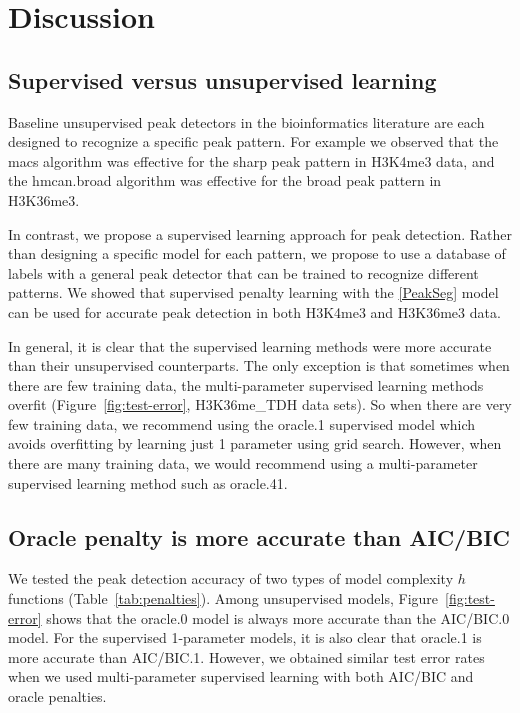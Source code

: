 \documentclass{article}
\begin{document}
\section{Discussion}
\label{sec:discussion}

\subsection{Supervised versus unsupervised learning}

Baseline unsupervised peak detectors in the bioinformatics literature
are each designed to recognize a specific peak pattern. For example we
observed that the macs algorithm was effective for the sharp peak
pattern in H3K4me3 data, and the hmcan.broad algorithm was effective
for the broad peak pattern in H3K36me3.

In contrast, we propose a supervised learning approach for peak
detection. Rather than designing a specific model for each pattern, we
propose to use a database of labels with a general peak detector that
can be trained to recognize different patterns. We showed that
supervised penalty learning with the \ref{PeakSeg} model can be used
for accurate peak detection in both H3K4me3 and H3K36me3 data.

In general, it is clear that the supervised learning methods were more
accurate than their unsupervised counterparts. The only exception is
that sometimes when there are few training data, the multi-parameter
supervised learning methods overfit (Figure~\ref{fig:test-error},
H3K36me\_TDH data sets). So when there are very few training data, we
recommend using the oracle.1 supervised model which avoids overfitting
by learning just 1 parameter using grid search. However, when there
are many training data, we would recommend using a multi-parameter
supervised learning method such as oracle.41.

\subsection{Oracle penalty is more accurate than AIC/BIC}

We tested the peak detection accuracy of two types of model complexity
$h$ functions (Table~\ref{tab:penalties}). Among unsupervised models,
Figure~\ref{fig:test-error} shows that the oracle.0 model is always
more accurate than the AIC/BIC.0 model. For the supervised 1-parameter
models, it is also clear that oracle.1 is more accurate than
AIC/BIC.1. However, we obtained similar test error rates when we used
multi-parameter supervised learning with both AIC/BIC and oracle
penalties.
\end{document}
